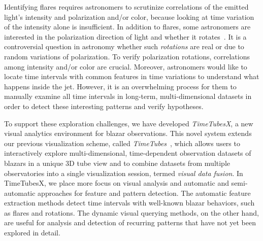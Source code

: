 Identifying flares requires astronomers to scrutinize correlations of the emitted light's intensity and polarization and/or color, because looking at time variation of the intensity alone is insufficient. %
%
In addition to flares, some astronomers are interested in the polarization direction of light and whether it rotates~\cite{Marscher2008, Uemura2017}.
It is a controversial question in astronomy whether such \textit{rotations} are real or due to random variations of polarization.
To verify polarization rotations, correlations among intensity and/or color are crucial.
Moreover, astronomers would like to locate time intervals with common features in  time variations
to understand what happens inside the jet.
However, it is an overwhelming process for them to manually examine all time intervals in long-term, multi-dimensional datasets in order to detect these interesting patterns and verify hypotheses.

To support these exploration challenges, 
we have developed \textit{TimeTubesX}, a new visual analytics environment for blazar observations. 
%
This novel system extends our previous visualization scheme, called \textit{TimeTubes}~\cite{Fujishiro2018}, 
which allows users to interactively explore multi-dimensional, time-dependent observation datasets of blazars in a unique 3D tube view and to combine datasets from multiple observatories into a single visualization session, termed \emph{visual data fusion}.
%
In TimeTubesX, we place more focus on visual analysis and automatic and semi-automatic approaches for feature and pattern detection.
The automatic feature extraction methods detect time intervals with well-known blazar behaviors, such as flares and rotations.
The dynamic visual querying methods, on the other hand, are useful for analysis and detection of recurring patterns that have not yet been explored in detail. 

